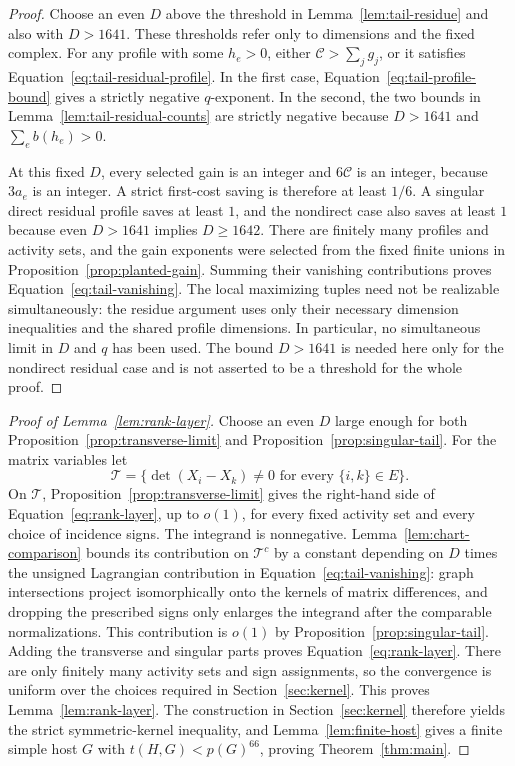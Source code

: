 \begin{proof}
Choose an even $D$ above the threshold in
Lemma~\ref{lem:tail-residue} and also with $D>1641$.  These thresholds
refer only to dimensions and the fixed complex.  For any profile with
some $h_e>0$, either $\mathcal C>\sum_jg_j$, or it satisfies
Equation~\eqref{eq:tail-residual-profile}.  In the first case,
Equation~\eqref{eq:tail-profile-bound} gives a strictly negative
$q$-exponent.  In the second, the two bounds in
Lemma~\ref{lem:tail-residual-counts} are strictly negative because
$D>1641$ and $\sum_e b(h_e)>0$.

At this fixed \(D\), every selected gain is an integer and
\(6\mathcal C\) is an integer, because \(3a_e\) is an integer.
A strict first-cost saving is therefore at least \(1/6\). A singular
direct residual profile saves at least \(1\), and the nondirect case
also saves at least \(1\) because even \(D>1641\) implies \(D\ge1642\).
There are finitely many profiles and activity sets, and the gain
exponents were selected from the fixed finite unions in
Proposition~\ref{prop:planted-gain}. Summing their vanishing
contributions proves Equation~\eqref{eq:tail-vanishing}.
The local maximizing tuples need not be realizable simultaneously:
the residue argument uses only their necessary dimension inequalities
and the shared profile dimensions.
In particular, no simultaneous limit in $D$ and $q$ has been used.
The bound $D>1641$ is needed here only for the nondirect residual
case and is not asserted to be a threshold for the whole proof.
\end{proof}

\begin{proof}[Proof of Lemma~\ref{lem:rank-layer}]
Choose an even $D$ large enough for both
Proposition~\ref{prop:transverse-limit} and
Proposition~\ref{prop:singular-tail}.  For the matrix variables let
\[
 \mathcal T=\{\det(X_i-X_k)\ne0\text{ for every }\{i,k\}\in E\}.
\]
On $\mathcal T$, Proposition~\ref{prop:transverse-limit} gives the
right-hand side of Equation~\eqref{eq:rank-layer}, up to $o(1)$,
for every fixed activity set and every choice of incidence signs.
The integrand is nonnegative.  Lemma~\ref{lem:chart-comparison}
bounds its contribution on $\mathcal T^c$ by a constant depending
on $D$ times the unsigned Lagrangian contribution in
Equation~\eqref{eq:tail-vanishing}: graph intersections project isomorphically
onto the kernels of matrix differences, and dropping the prescribed signs
only enlarges the integrand after the comparable normalizations.
This contribution is $o(1)$ by
Proposition~\ref{prop:singular-tail}.  Adding the transverse and
singular parts proves Equation~\eqref{eq:rank-layer}.
There are only finitely many activity sets and sign assignments, so
the convergence is uniform over the choices required in
Section~\ref{sec:kernel}.  This proves Lemma~\ref{lem:rank-layer}.
The construction in Section~\ref{sec:kernel} therefore yields the strict
symmetric-kernel inequality, and Lemma~\ref{lem:finite-host} gives a finite
simple host $G$ with $t(H,G)<p(G)^{66}$, proving Theorem~\ref{thm:main}.
\end{proof}
